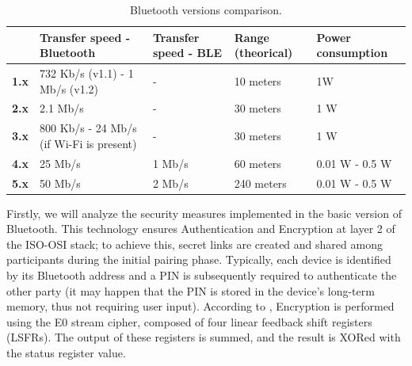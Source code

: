 \documentclass[english]{article}
\newcounter{subsubsubsection}[subsubsection]
\begin{document}
\begin{table}[h]
  \caption{Bluetooth versions comparison.}
  \centering
  \begin{adjustbox}{max width=\textwidth}
  \begin{tabular}{l|l|l|l|l|}
  \cline{2-5}
                                     & \textbf{Transfer speed - Bluetooth}      & \textbf{Transfer speed - BLE} & \textbf{Range (theorical)} & \textbf{Power consumption} \\ \hline
  \multicolumn{1}{|l|}{\textbf{1.x}} & 732 Kb/s (v1.1) - 1 Mb/s (v1.2)            & -                             & 10 meters                  & 1W                         \\ \hline
  \multicolumn{1}{|l|}{\textbf{2.x}} & 2.1 Mb/s                                 & -                             & 30 meters                  & 1 W                        \\ \hline
  \multicolumn{1}{|l|}{\textbf{3.x}} & 800 Kb/s - 24 Mb/s (if Wi-Fi is present) & -                             & 30 meters                  & 1 W                        \\ \hline
  \multicolumn{1}{|l|}{\textbf{4.x}} & 25 Mb/s                                  & 1 Mb/s                        & 60 meters                  & 0.01 W - 0.5 W             \\ \hline
  \multicolumn{1}{|l|}{\textbf{5.x}} & 50 Mb/s                                  & 2 Mb/s                        & 240 meters                 & 0.01 W - 0.5 W             \\ \hline
  \end{tabular}
  \end{adjustbox}
  \label{tabBle}
\end{table}

Firstly, we will analyze the security measures implemented in the basic version of Bluetooth. This technology ensures Authentication and Encryption at layer 2 of the ISO-OSI stack; to achieve this, secret links are created and shared among participants during the initial pairing phase. Typically, each device is identified by its Bluetooth address and a PIN is subsequently required to authenticate the other party (it may happen that the PIN is stored in the device's long-term memory, thus not requiring user input). According to \cite{1200664}, Encryption is performed using the E0 stream cipher, composed of four linear feedback shift registers (LSFRs). The output of these registers is summed, and the result is XORed with the status register value.
\end{document}
